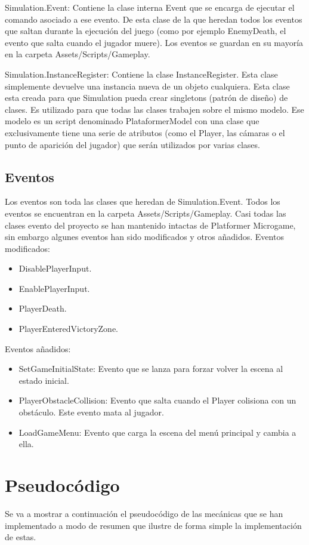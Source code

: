 Simulation.Event: Contiene la clase interna Event que se encarga de ejecutar el comando asociado a ese evento. De esta clase de la que heredan todos los eventos que saltan durante la ejecución del juego (como por ejemplo EnemyDeath, el evento que salta cuando el jugador muere). Los eventos se guardan en su mayoría en la carpeta Assets/Scripts/Gameplay.

Simulation.InstanceRegister: Contiene la clase InstanceRegister. Esta clase simplemente devuelve una instancia nueva de un objeto cualquiera. Esta clase esta creada para que Simulation pueda crear singletons (patrón de diseño) de clases. Es utilizado para que todas las clases trabajen sobre el mismo modelo. Ese modelo es un script denominado PlataformerModel con una clase que exclusivamente tiene una serie de atributos (como el Player, las cámaras o el punto de aparición del jugador) que serán utilizados por varias clases.

\subsection{Eventos}
Los eventos son toda las clases que heredan de Simulation.Event. Todos los eventos se encuentran en la carpeta Assets/Scripts/Gameplay. Casi todas las clases evento del proyecto se han mantenido intactas de Platformer Microgame, sin embargo algunes eventos han sido modificados y otros añadidos.
Eventos modificados:
\begin{itemize}
\item
DisablePlayerInput.
\item
EnablePlayerInput.
\item
PlayerDeath.
\item
PlayerEnteredVictoryZone.
\end{itemize}
Eventos añadidos:
\begin{itemize}
\item
SetGameInitialState: Evento que se lanza para forzar volver la escena al estado inicial.
\item
PlayerObstacleCollision: Evento que salta cuando el Player colisiona con un obstáculo. Este evento mata al jugador.
\item
LoadGameMenu: Evento que carga la escena del menú principal y cambia a ella.
\end{itemize}

\section{Pseudocódigo}
Se va a mostrar a continuación el pseudocódigo de las mecánicas que se han implementado a modo de resumen que ilustre de forma simple la implementación de estas.

